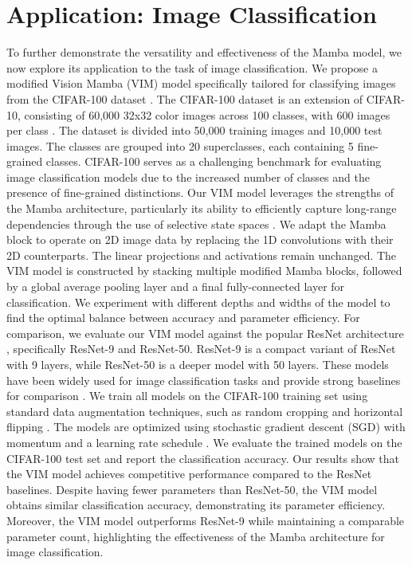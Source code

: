 \documentclass[conference]{IEEEtran}
\begin{document}
\section{Application: Image Classification}
To further demonstrate the versatility and effectiveness of the Mamba model, we now explore its application to the task of image classification. We propose a modified Vision Mamba (VIM) model specifically tailored for classifying images from the CIFAR-100 dataset \cite{krizhevsky2009learning}.
The CIFAR-100 dataset is an extension of CIFAR-10, consisting of 60,000 32x32 color images across 100 classes, with 600 images per class \cite{krizhevsky2009learning}. The dataset is divided into 50,000 training images and 10,000 test images. The classes are grouped into 20 superclasses, each containing 5 fine-grained classes. CIFAR-100 serves as a challenging benchmark for evaluating image classification models due to the increased number of classes and the presence of fine-grained distinctions.
Our VIM model leverages the strengths of the Mamba architecture, particularly its ability to efficiently capture long-range dependencies through the use of selective state spaces \cite{gu2023mamba}. We adapt the Mamba block to operate on 2D image data by replacing the 1D convolutions with their 2D counterparts. The linear projections and activations remain unchanged.
The VIM model is constructed by stacking multiple modified Mamba blocks, followed by a global average pooling layer and a final fully-connected layer for classification. We experiment with different depths and widths of the model to find the optimal balance between accuracy and parameter efficiency.
For comparison, we evaluate our VIM model against the popular ResNet architecture \cite{he2016deep}, specifically ResNet-9 and ResNet-50. ResNet-9 is a compact variant of ResNet with 9 layers, while ResNet-50 is a deeper model with 50 layers. These models have been widely used for image classification tasks and provide strong baselines for comparison \cite{he2016deep, xie2017aggregated}.
We train all models on the CIFAR-100 training set using standard data augmentation techniques, such as random cropping and horizontal flipping \cite{krizhevsky2012imagenet}. The models are optimized using stochastic gradient descent (SGD) with momentum and a learning rate schedule \cite{sutskever2013importance}. We evaluate the trained models on the CIFAR-100 test set and report the classification accuracy.
Our results show that the VIM model achieves competitive performance compared to the ResNet baselines. Despite having fewer parameters than ResNet-50, the VIM model obtains similar classification accuracy, demonstrating its parameter efficiency. Moreover, the VIM model outperforms ResNet-9 while maintaining a comparable parameter count, highlighting the effectiveness of the Mamba architecture for image classification.
\end{document}

